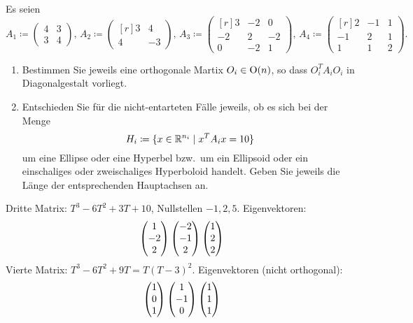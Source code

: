 \documentclass[a4paper, 10pt]{scrartcl}
\begin{document}
\begin{question}
  Es seien
  \[
    A_1
    \coloneqq
    \begin{pmatrix}
      4 & 3 \\
      3 & 4
    \end{pmatrix},
    \,
    A_2
    \coloneqq
    \begin{pmatrix*}[r]
      3 &  4  \\
      4 & -3
    \end{pmatrix*},
    \,
    A_3
    \coloneqq
    \begin{pmatrix*}[r]
       3  & -2  &  0  \\
      -2  &  2  & -2  \\
       0  & -2  &  1
    \end{pmatrix*},
    \,
    A_4
    \coloneqq
    \begin{pmatrix*}[r]
       2  & -1  & 1 \\
      -1  &  2  & 1 \\
       1  &  1  & 2
    \end{pmatrix*}.
  \]
  \begin{enumerate}[leftmargin=*]
    \item
      Bestimmen Sie jeweils eine orthogonale Martix $O_i \in \mathrm{O}(n)$, so dass $O_i^T A_i O_i$ in Diagonalgestalt vorliegt.
    \item
      Entschieden Sie für die nicht-entarteten Fälle jeweils, ob es sich bei der Menge
      \[
        H_i \coloneqq \{ x \in \mathbb{R}^{n_i} \mid x^T A_i x = 10 \}
      \]
      um eine Ellipse oder eine Hyperbel bzw.\ um ein Ellipsoid oder ein einschaliges oder zweischaliges Hyperboloid handelt.
      Geben Sie jeweils die Länge der entsprechenden Hauptachsen an.
  \end{enumerate}
\end{question}


\begin{solution}
  Dritte Matrix: $T^3 - 6 T^2 + 3 T + 10$, Nullstellen $-1, 2, 5$.
  Eigenvektoren:
  \[
    \begin{pmatrix} 1 \\ -2 \\ 2 \end{pmatrix}
    \begin{pmatrix} -2 \\ -1 \\ 2 \end{pmatrix}
    \begin{pmatrix} 1 \\ 2 \\ 2 \end{pmatrix}
  \]
  Vierte Matrix: $T^3 - 6 T^2 + 9 T = T(T-3)^2$.
  Eigenvektoren (nicht orthogonal):
  \[
    \begin{pmatrix} 1 \\  0 \\ 1 \end{pmatrix}
    \begin{pmatrix} 1 \\ -1 \\ 0 \end{pmatrix}
    \begin{pmatrix} 1 \\  1 \\ 1 \end{pmatrix}
  \]

\end{solution}
\end{document}
